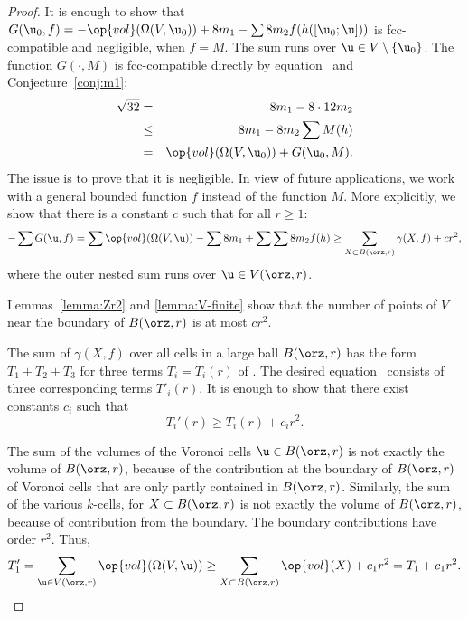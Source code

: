 \begin{proof} 
It is enough to show that $G( \u_0,f) = -\op{vol}(\Omega(V, \u_0)) + 8
m_1 - \sum 8 m_2 f(h([\u_0;\u]))$ is fcc-compatible and negligible, when $f=M$.
The sum runs over $\u\in V\setminus\{\u_0\}$.
The function $G(\cdot,M)$ is fcc-compatible directly
by equation~
and Conjecture~\ref{conj:m1}:
%
%
\begin{eqnarray*} 
\sqrt{32} &=& 8 m_1 - 8\cdot 12 m_2\\
&\le& 8 m_1 - 8 m_2 \sum M(h)\\
&=& \op{vol}(\Omega(V, \u_0)) + G( \u_0,M).
\end{eqnarray*}
The issue is to prove that it is negligible.  In view of future applications, 
we work with a general bounded function $f$ instead
of the function $M$.   More explicitly, we show that there is a
constant $c$ such that for all $r\ge 1$:%
\begin{equation}\label{eqn:neg} 
-\sum G( \u,f) = \sum \op{vol}(\Omega(V, \u)) 
-\sum 8m_1 + \sum \sum 8 m_2 f(h) \ge \sum_{X\subset B(\orz,r)} \gamma(X,f)  + c r^2,
\end{equation}
where the outer nested sum runs over $ \u\in  V(\orz,r)$.  

Lemmas~\ref{lemma:Zr2} and \ref{lemma:V-finite} show that the number
of points of $ V$ near the boundary of $B(\orz,r)$ is at most $c r^2$.


The sum of $\gamma(X,f)$ over all cells in a large ball
$B(\orz,r)$ has the form $T_1 + T_2 + T_3$ for
three terms $T_i = T_i(r)$ of .  The desired
equation~ consists of three corresponding terms
$T'_i(r)$.  It is enough to show that there exist constants $c_i$ such that
\begin{displaymath} 
T_i'(r) \ge T_i(r) + c_i r^2.
\end{displaymath}

The sum of the volumes of the Voronoi cells $ \u\in B(\orz,r)$ is not
exactly the volume of $B(\orz,r)$, because of the contribution at the
boundary of $B(\orz,r)$ of Voronoi cells that are only partly contained
in $B(\orz,r)$.  Similarly, the sum of the various $k$-cells, for
$X\subset B(\orz,r)$ is not exactly the volume of $B(\orz,r)$, because of
contribution from the boundary. The boundary contributions have order
$r^2$. Thus,
\begin{displaymath} 
T_1'= \sum_{ \u\in  V(\orz,r)} \op{vol}(\Omega(V, \u)) 
\ge \sum_{X\subset B(\orz,r)} \op{vol}(X) + c_1 r^2 = T_1 + c_1 r^2.
\end{displaymath}



\end{proof}
